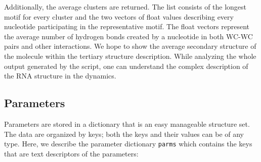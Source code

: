 \documentclass[12pt]{article}
\begin{document}
Additionally, the average clusters are returned. The list consists of the longest motif for every cluster and the two vectors of float values describing every nucleotide participating in the representative motif. The float vectors represent the average number of hydrogen bonds created by a nucleotide in both WC-WC pairs and other interactions. We hope to show the average secondary structure of the molecule within the tertiary structure description. While analyzing the whole output generated by the script, one can understand the complex description of the RNA structure in the dynamics.

\subsection{Parameters}
Parameters are stored in a dictionary that is an easy manageable structure set. The data are organized by keys; both the keys and their values can be of any type. Here, we describe the parameter dictionary \texttt{parms} which contains the keys that are text descriptors of the parameters:
\end{document}

